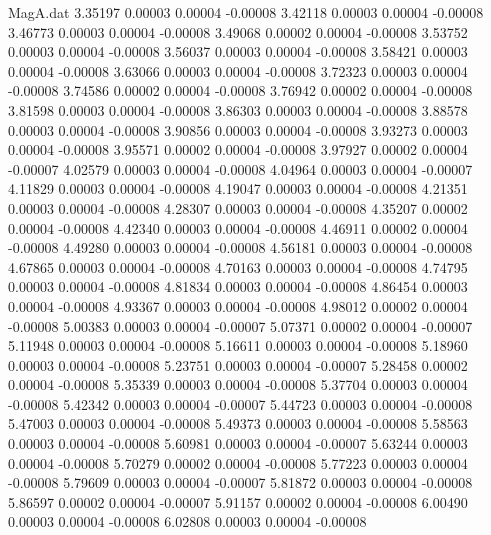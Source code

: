 \begin{filecontents}{MagA.dat}
   3.35197    0.00003    0.00004   -0.00008
   3.42118    0.00003    0.00004   -0.00008
   3.46773    0.00003    0.00004   -0.00008
   3.49068    0.00002    0.00004   -0.00008
   3.53752    0.00003    0.00004   -0.00008
   3.56037    0.00003    0.00004   -0.00008
   3.58421    0.00003    0.00004   -0.00008
   3.63066    0.00003    0.00004   -0.00008
   3.72323    0.00003    0.00004   -0.00008
   3.74586    0.00002    0.00004   -0.00008
   3.76942    0.00002    0.00004   -0.00008
   3.81598    0.00003    0.00004   -0.00008
   3.86303    0.00003    0.00004   -0.00008
   3.88578    0.00003    0.00004   -0.00008
   3.90856    0.00003    0.00004   -0.00008
   3.93273    0.00003    0.00004   -0.00008
   3.95571    0.00002    0.00004   -0.00008
   3.97927    0.00002    0.00004   -0.00007
   4.02579    0.00003    0.00004   -0.00008
   4.04964    0.00003    0.00004   -0.00007
   4.11829    0.00003    0.00004   -0.00008
   4.19047    0.00003    0.00004   -0.00008
   4.21351    0.00003    0.00004   -0.00008
   4.28307    0.00003    0.00004   -0.00008
   4.35207    0.00002    0.00004   -0.00008
   4.42340    0.00003    0.00004   -0.00008
   4.46911    0.00002    0.00004   -0.00008
   4.49280    0.00003    0.00004   -0.00008
   4.56181    0.00003    0.00004   -0.00008
   4.67865    0.00003    0.00004   -0.00008
   4.70163    0.00003    0.00004   -0.00008
   4.74795    0.00003    0.00004   -0.00008
   4.81834    0.00003    0.00004   -0.00008
   4.86454    0.00003    0.00004   -0.00008
   4.93367    0.00003    0.00004   -0.00008
   4.98012    0.00002    0.00004   -0.00008
   5.00383    0.00003    0.00004   -0.00007
   5.07371    0.00002    0.00004   -0.00007
   5.11948    0.00003    0.00004   -0.00008
   5.16611    0.00003    0.00004   -0.00008
   5.18960    0.00003    0.00004   -0.00008
   5.23751    0.00003    0.00004   -0.00007
   5.28458    0.00002    0.00004   -0.00008
   5.35339    0.00003    0.00004   -0.00008
   5.37704    0.00003    0.00004   -0.00008
   5.42342    0.00003    0.00004   -0.00007
   5.44723    0.00003    0.00004   -0.00008
   5.47003    0.00003    0.00004   -0.00008
   5.49373    0.00003    0.00004   -0.00008
   5.58563    0.00003    0.00004   -0.00008
   5.60981    0.00003    0.00004   -0.00007
   5.63244    0.00003    0.00004   -0.00008
   5.70279    0.00002    0.00004   -0.00008
   5.77223    0.00003    0.00004   -0.00008
   5.79609    0.00003    0.00004   -0.00007
   5.81872    0.00003    0.00004   -0.00008
   5.86597    0.00002    0.00004   -0.00007
   5.91157    0.00002    0.00004   -0.00008
   6.00490    0.00003    0.00004   -0.00008
   6.02808    0.00003    0.00004   -0.00008

\end{filecontents}
